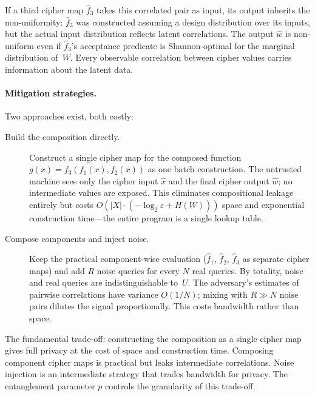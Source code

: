 \documentclass[11pt]{article}
\theoremstyle{definition}
\theoremstyle{plain}
\theoremstyle{remark}
\newcommand{\fhat}{\hat{f}}
\begin{document}
If a third cipher map $\fhat_3$ takes this correlated pair as input, its
output inherits the non-uniformity: $\fhat_3$ was constructed assuming a
design distribution over its inputs, but the actual input distribution
reflects latent correlations.  The output $\hat{w}$ is non-uniform even if
$\fhat_3$'s acceptance predicate is Shannon-optimal for the marginal
distribution of~$W$.  Every observable correlation between cipher values
carries information about the latent data.

\paragraph{Mitigation strategies.}
Two approaches exist, both costly:

\begin{description}
\item[Build the composition directly.]
Construct a single cipher map for the composed function
$g(x) = f_3(f_1(x), f_2(x))$ as one batch construction.  The untrusted
machine sees only the cipher input $\hat{x}$ and the final cipher output
$\hat{w}$; no intermediate values are exposed.  This eliminates
compositional leakage entirely but costs $O(|X| \cdot (-\log_2 \varepsilon
+ H(W)))$ space and exponential construction time---the entire program is
a single lookup table.

\item[Compose components and inject noise.]
Keep the practical component-wise evaluation ($\fhat_1$, $\fhat_2$,
$\fhat_3$ as separate cipher maps) and add $R$ noise queries for every
$N$ real queries.  By totality, noise and real queries are
indistinguishable to~$U$.  The adversary's estimates of pairwise
correlations have variance $O(1/N)$; mixing with $R \gg N$ noise pairs
dilutes the signal proportionally.  This costs bandwidth rather than space.
\end{description}

The fundamental trade-off: constructing the composition as a single cipher
map gives full privacy at the cost of space and construction time.
Composing component cipher maps is practical but leaks intermediate
correlations.  Noise injection is an intermediate strategy that trades
bandwidth for privacy.  The entanglement parameter $p$ controls the
granularity of this trade-off.
\end{document}
